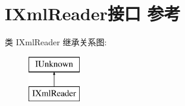 \hypertarget{interface_i_xml_reader}{}\section{I\+Xml\+Reader接口 参考}
\label{interface_i_xml_reader}
类 I\+Xml\+Reader 继承关系图\+:\begin{figure}[H]
\begin{center}
\leavevmode
\includegraphics[height=2.000000cm]{interface_i_xml_reader}
\end{center}
\end{figure}
